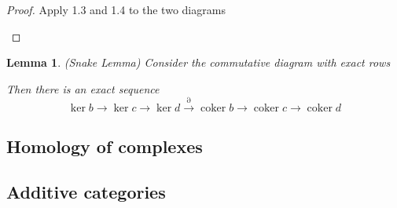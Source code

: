 \documentclass[5pt]{article}
\newtheorem{lemma}[theorem]{Lemma}
\theoremstyle{definition}
\theoremstyle{remark}
\renewcommand{\bar}[1]{\overline{#1}}
\DeclareMathOperator{\coker}{coker}
\begin{document}
	\begin{proof}
		Apply 1.3 and 1.4 to the two diagrams
		\begin{center}
		\end{center}
	\end{proof}		
	
	\begin{lemma}{(Snake Lemma)}
		Consider the commutative diagram with exact rows
		\begin{center}
		\end{center}
		Then there is an exact sequence
		\begin{equation}
			\ker b \rightarrow \ker c \rightarrow \ker d \xrightarrow{\partial} \coker b \rightarrow \coker c \rightarrow \coker d
		\end{equation}
	\end{lemma}
	\subsection{Homology of complexes}
	
	\subsection{Additive categories}
	
\end{document}
